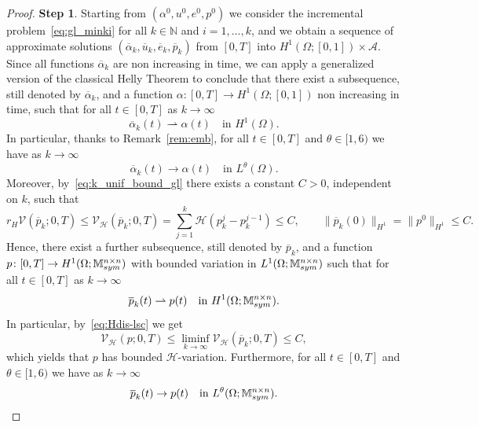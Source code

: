 \documentclass[reqno]{amsart}
\theoremstyle{definition}
\numberwithin{equation}{section}
\def\N {\mathbb N}
\def\M {\mathbb M^{n\times n}_{\rm sym}}
\begin{document}
\begin{proof}
{\bf Step 1}. Starting from $(\alpha^0,u^0,e^0,p^0)$ we consider the incremental problem~\eqref{eq:gl_minki} for all $k\in\N$ and $i=1,\dots,k$, and we obtain a sequence of approximate solutions $(\overline\alpha_k,\overline u_k,\overline e_k,\overline p_k)$ from $[0,T]$ into $H^1(\Omega;[0,1])\times\mathcal A$. Since all functions $\overline\alpha_k$ are non increasing in time, we can apply a generalized version of the classical Helly Theorem to conclude that there
exist a subsequence, still denoted by $\overline\alpha_k$, and a function $\alpha\colon[0,T]\to H^1(\Omega;[0,1])$ non increasing in time, such that for all $t\in[0,T]$ as $k\to\infty$
$$\overline\alpha_k(t)\rightharpoonup \alpha(t)\quad\text{in $H^1(\Omega)$}.$$ 
In particular, thanks to Remark~\ref{rem:emb}, for all $t\in[0,T]$ and $\theta\in[1,6)$ we have as $k\to\infty$
$$\overline\alpha_k(t)\to \alpha(t)\quad\text{in $L^\theta(\Omega)$}.$$ 
Moreover, by~\eqref{eq:k_unif_bound_gl} there exists a constant $C>0$, independent on $k$, such that
$$r_H\mathcal V(\overline p_k;0,T)\le\mathcal V_{\mathcal H}(\overline p_k;0,T)=\sum_{j=1}^k\mathcal H(p_k^j-p_k^{j-1})\le C,\qquad\|\overline p_k(0)\|_{H^1}=\|p^0\|_{H^1}\le C.$$ 
Hence, there exist a further subsequence, still denoted by $\overline p_k$, and a function $p\colon[0,T]\to H^1(\Omega;\M)$ with bounded variation in $L^1(\Omega;\M)$ such that  for all $t\in[0,T]$ as $k\to\infty$
$$\overline p_k(t)\rightharpoonup p(t)\quad\text{in $H^1(\Omega;\M)$}.$$ 
In particular, by~\eqref{eq:Hdis-lsc} we get
$$\mathcal V_{\mathcal H}(p;0,T)\le \liminf_{k\to\infty}\mathcal V_{\mathcal H}(\overline p_k;0,T)\le C,$$
which yields that $p$ has bounded $\mathcal H$-variation. Furthermore, for all $t\in[0,T]$ and $\theta\in[1,6)$ we have as $k\to\infty$
$$\overline p_k(t)\to p(t)\quad\text{in $L^\theta(\Omega;\M)$}.$$ 


\end{proof}
\end{document}
